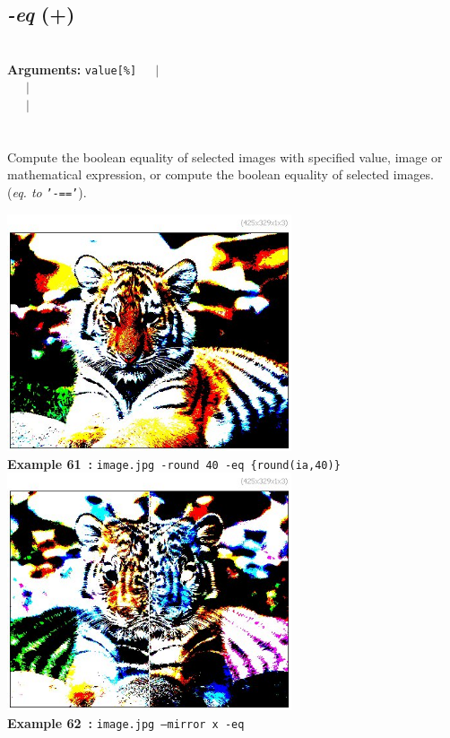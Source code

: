 \documentclass[a4paper,11pt,twoside]{book}
\begin{document}
\subsection{\emph{-eq} (+)}\vspace*{-0.5em}
~\\\textbf{Arguments: } 
{\small \texttt{value[\%]}}~~~$|$\\
\hspace*{2.2cm}{\small \texttt{[image]}}~~~$|$\\
~~~$|$\\
\\~\\
Compute the boolean equality of selected images with specified value, image or
mathematical expression, or compute the boolean equality of selected images.
~\\(\emph{eq. to} {\small \texttt{'-=='}}).
\begin{center}\includegraphics[keepaspectratio=true,height=7cm,width=\textwidth]{img/gmic_def61.jpg}\\
{\footnotesize \textbf{Example 61~:} \texttt{image.jpg -round 40 -eq \{round(ia,40)\}}}
\\\includegraphics[keepaspectratio=true,height=7cm,width=\textwidth]{img/gmic_def62.jpg}\\
{\footnotesize \textbf{Example 62~:} \texttt{image.jpg --mirror x -eq}}
\end{center}
\end{document}
